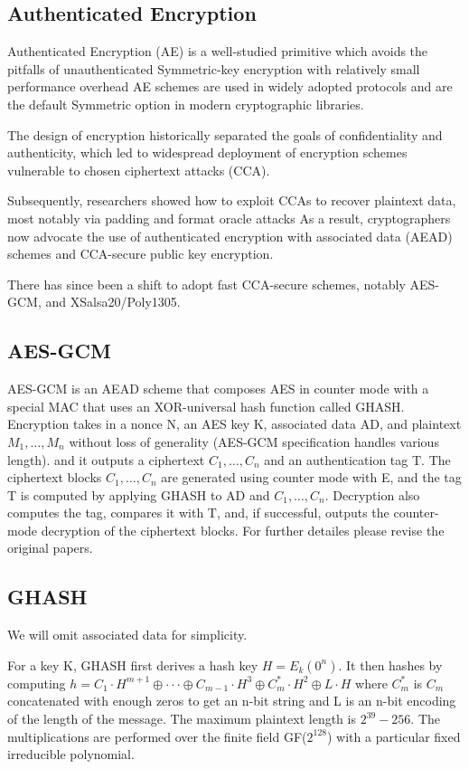 \subsection*{Authenticated Encryption}\label{subsec:authenticated-encryption}
Authenticated Encryption (AE)\cite{rfc5116} is a well-studied primitive which avoids the pitfalls of unauthenticated
Symmetric-key encryption with relatively small performance overhead
AE schemes are used in widely adopted protocols and are the default Symmetric option in modern cryptographic libraries.

The design of encryption historically separated the goals of confidentiality and authenticity, which led to widespread
deployment of encryption schemes vulnerable to chosen ciphertext attacks (CCA).

Subsequently, researchers showed how to exploit CCAs to recover plaintext data, most notably via padding and
format oracle attacks
As a result, cryptographers now advocate the use of authenticated encryption with associated data (AEAD) schemes and CCA-secure
public key encryption.

There has since been a shift to adopt fast CCA-secure schemes, notably AES-GCM, and XSalsa20/Poly1305.

\subsection*{AES-GCM}\label{subsec:aes-gcm}
AES-GCM is an AEAD scheme that composes AES in counter mode with a special MAC
that uses an XOR-universal hash function called GHASH.
Encryption takes in a nonce N, an AES key K, associated data AD, and plaintext $M_{1},\ldots,M_{n}$ without loss of generality (AES-GCM specification handles various length).
and it outputs a ciphertext $C_{1},\ldots,C_{n}$ and an authentication tag T.
The ciphertext blocks $C_{1},\ldots,C_{n}$ are generated using counter mode with E, and the tag T
is computed by applying GHASH to AD and $C_{1},\ldots,C_{n}$.
Decryption also computes the tag, compares it with T, and, if successful, outputs the counter-mode decryption of the ciphertext
blocks.
For further detailes please revise the original papers.\cite{mg04}

\subsection*{GHASH}\label{subsec:ghash}
We will omit associated data for simplicity.

For a key K, GHASH first derives a hash key $H = E_k(0^n)$.
It then hashes by computing
$h = C_1 \cdot H^{m+1} \oplus\cdot\cdot\cdot\oplus C_{m-1} \cdot H^3 \oplus C_m^\ast \cdot H^2 \oplus L \cdot H$
where $C_m^\ast$ is $C_m$ concatenated with enough zeros to get an
n-bit string and L is an n-bit encoding of the length of the
message.
The maximum plaintext length is $2^{39} - 256$.
The multiplications are performed over the finite field GF($2^{128}$) with a particular fixed irreducible polynomial.